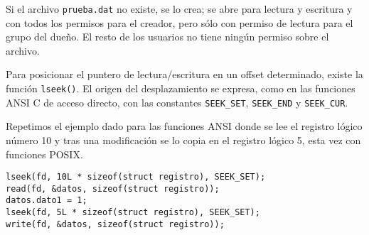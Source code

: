 Si el archivo \lstinline{prueba.dat} no existe, se lo crea; se abre para lectura y
escritura y con todos los permisos para el creador, pero sólo con permiso de
lectura para el grupo del dueño. El resto de los usuarios no tiene ningún
permiso sobre el archivo.

Para posicionar el puntero de lectura/escritura en un offset determinado,
existe la función \lstinline{lseek()}. El origen del desplazamiento se expresa, como en las
funciones ANSI C de acceso directo, con las constantes \lstinline{SEEK_SET}, \lstinline{SEEK_END} y
\lstinline{SEEK_CUR}.

\begin{ejemplo}
Repetimos el ejemplo dado para las funciones ANSI donde se lee el registro
lógico número 10 y tras una modificación se lo copia en el registro lógico 5,
esta vez con funciones POSIX.

\begin{lstlisting}
lseek(fd, 10L * sizeof(struct registro), SEEK_SET);
read(fd, &datos, sizeof(struct registro));
datos.dato1 = 1;
lseek(fd, 5L * sizeof(struct registro), SEEK_SET);
write(fd, &datos, sizeof(struct registro));
\end{lstlisting}
\end{ejemplo}



